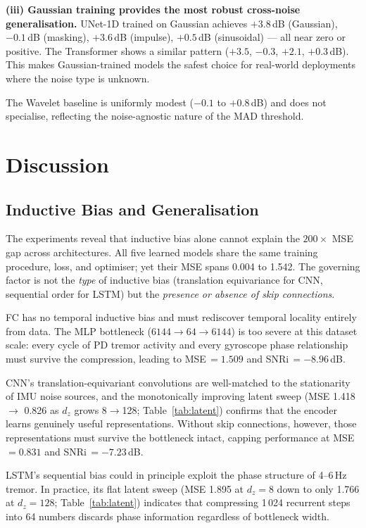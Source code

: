 \documentclass{article}
\begin{document}
\textbf{(iii) Gaussian training provides the most robust cross-noise
generalisation.}
UNet-1D trained on Gaussian achieves $+3.8$\,dB (Gaussian), $-0.1$\,dB
(masking), $+3.6$\,dB (impulse), $+0.5$\,dB (sinusoidal) --- all near zero
or positive.
The Transformer shows a similar pattern ($+3.5$, $-0.3$, $+2.1$, $+0.3$\,dB).
This makes Gaussian-trained models the safest choice for real-world deployments
where the noise type is unknown.

The Wavelet baseline is uniformly modest ($-0.1$ to $+0.8$\,dB) and does not
specialise, reflecting the noise-agnostic nature of the MAD threshold.

\section{Discussion}
\label{sec:discussion}

\subsection{Inductive Bias and Generalisation}

The experiments reveal that inductive bias alone cannot explain the
$200\times$ MSE gap across architectures.
All five learned models share the same training procedure, loss, and
optimiser; yet their MSE spans 0.004 to 1.542.
The governing factor is not the \emph{type} of inductive bias (translation
equivariance for CNN, sequential order for LSTM) but the
\emph{presence or absence of skip connections}.

FC has no temporal inductive bias and must rediscover temporal locality
entirely from data.
The MLP bottleneck ($6144\to64\to6144$) is too severe at this dataset scale:
every cycle of PD tremor activity and every gyroscope phase relationship must
survive the compression, leading to MSE\,$= 1.509$ and SNRi\,$= -8.96$\,dB.

CNN's translation-equivariant convolutions are well-matched to the
stationarity of IMU noise sources, and the monotonically improving latent
sweep (MSE 1.418 $\to$ 0.826 as $d_z$ grows 8$\to$128; Table~\ref{tab:latent})
confirms that the encoder learns genuinely useful representations.
Without skip connections, however, those representations must survive the
bottleneck intact, capping performance at MSE\,$= 0.831$ and
SNRi\,$= -7.23$\,dB.

LSTM's sequential bias could in principle exploit the phase structure of
4--6\,Hz tremor.
In practice, its flat latent sweep
(MSE 1.895 at $d_z=8$ down to only 1.766 at $d_z=128$;
Table~\ref{tab:latent}) indicates that compressing 1\,024 recurrent steps
into 64 numbers discards phase information regardless of bottleneck width.
\end{document}

